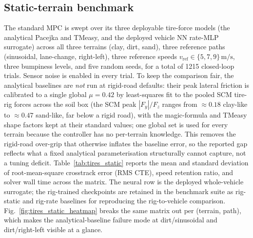 \documentclass[conference,letterpaper,10pt]{IEEEtran}
\begin{document}
\subsection{Static-terrain benchmark}
\label{sec:tires_static}

The standard MPC is swept over its three deployable tire-force models
(the analytical Pacejka and TMeasy, and the deployed vehicle NN rate-MLP
surrogate) across all
three terrains (clay, dirt, sand), three reference paths (sinusoidal,
lane-change, right-left), three reference speeds
$v_{\mathrm{ref}}\in\{5,7,9\}\,\mathrm{m/s}$, three bumpiness levels,
and five random seeds, for a total of 1215 closed-loop trials. Sensor
noise is enabled in every trial. To keep the comparison fair, the
analytical baselines are \emph{not} run at rigid-road defaults: their
peak lateral friction is calibrated to a single global $\mu=0.42$ by
least-squares fit to the pooled SCM tire-rig forces across the soil box
(the SCM peak $|F_y|/F_z$ ranges from $\approx 0.18$ clay-like to
$\approx 0.47$ sand-like, far below a rigid road), with the
magic-formula and TMeasy shape factors kept at their standard values;
one global set is used for every terrain because the controller has no
per-terrain knowledge. This removes the rigid-road over-grip that
otherwise inflates the baseline error, so the reported gap reflects what
a fixed analytical parameterisation structurally cannot capture, not a
tuning deficit.
Table~\ref{tab:tires_static} reports the mean and standard deviation
of root-mean-square crosstrack error (RMS CTE), speed retention
ratio, and solver wall time across the matrix. The neural row is the
deployed whole-vehicle surrogate; the rig-trained checkpoints are
retained in the benchmark suite as rig-static and rig-rate baselines for
reproducing the rig-to-vehicle comparison. Fig.~\ref{fig:tires_static_heatmap} breaks the same matrix
out per (terrain, path), which makes the analytical-baseline failure
mode at dirt/sinusoidal and dirt/right-left visible at a glance.
\end{document}
